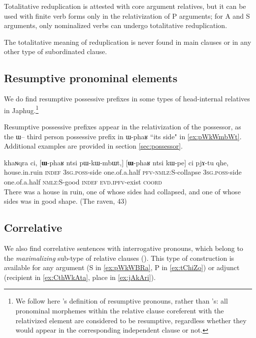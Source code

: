 \documentclass[oldfontcommands,oneside,a4paper,11pt]{article}
\newcommand{\ipa}[1]{{\phon #1}} %
\begin{document}
Totalitative reduplication is attested with core argument relatives, but it can be used with finite verb forms only in the relativization of P arguments; for A and S arguments, only nominalized verbs can undergo totalitative reduplication. 

The totalitative meaning of reduplication is never found in main clauses or in any other type of subordinated clause.


\subsection{Resumptive pronominal elements} \label{sec:resumptive}

We do find   resumptive possessive prefixes   in some types of head-internal relatives in Japhug.\footnote{We follow here \citet[211]{creissels06sgit2}'s definition of resumptive pronouns, rather than \citet{comrie81relative}'s: all pronominal morphemes within the relative clause coreferent with the relativized element are considered to be resumptive, regardless whether they would appear in the corresponding independent clause or not. }

Resumptive possessive prefixes appear in the relativization of the possessor, as the \ipa{ɯ}-- third person possessive prefix in \ipa{ɯ-phaʁ} ``its side" in  \ref{ex:pWkWmbWt}. Additional examples are provided in section \ref{sec:possessor}.

  \begin{exe}
\ex \label{ex:pWkWmbWt}
\gll
\ipa{khaɴqra}  	\ipa{ci,}  	[\ipa{\textbf{ɯ}-phaʁ}  	\ipa{ntsi}  	\ipa{pɯ-kɯ-mbɯt,}]  	[\ipa{\textbf{ɯ}-phaʁ}  	\ipa{ntsi}  	\ipa{kɯ-pe}]  	\ipa{ci}  	\ipa{pjɤ-tu}  	\ipa{qhe,}  \\
house.in.ruin \textsc{indef} \textsc{3sg.poss}-side one.of.a.half \textsc{pfv-nmlz}:S-collapse \textsc{3sg.poss}-side one.of.a.half \textsc{nmlz}:S-good \textsc{indef} \textsc{evd.ipfv}-exist  \textsc{coord} \\
\glt There was a house in ruin, one of whose sides had collapsed, and one of whose sides was in good shape. (The raven, 43)
\end{exe}


\subsection{Correlative} \label{sec:correlative}
We also find correlative sentences with interrogative pronouns, which belong to the \textit{maximalizing} sub-type of relative clauses (\citealt{grosu98maximalizing}).
 This type of construction is available for any argument (S in \ref{ex:pWkWBRa}, P in \ref{ex:tChiZo}) or adjunct (recipient in \ref{ex:CthWkAta}, place in \ref{ex:jAkAri}).
\end{document}
